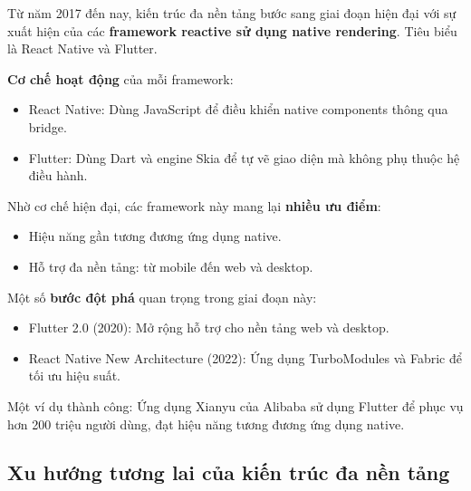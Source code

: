 \begin{flushleft}
  \begin{flushleft}
    Từ năm 2017 đến nay, kiến trúc đa nền tảng bước sang giai đoạn hiện đại với sự xuất hiện của 
    các \textbf{framework reactive sử dụng native rendering}. Tiêu biểu là React Native và Flutter.
  \end{flushleft}

  \begin{flushleft}
    \textbf{Cơ chế hoạt động} của mỗi framework:
    \setlength{\leftmargini}{1.5cm}
    \begin{itemize}
      \item React Native: Dùng JavaScript để điều khiển native components thông qua bridge.
      \item Flutter: Dùng Dart và engine Skia để tự vẽ giao diện mà không phụ thuộc hệ điều hành.
    \end{itemize}
  \end{flushleft}

  \begin{flushleft}
    Nhờ cơ chế hiện đại, các framework này mang lại \textbf{nhiều ưu điểm}:
    \setlength{\leftmargini}{1.5cm}
    \begin{itemize}
      \item Hiệu năng gần tương đương ứng dụng native.
      \item Hỗ trợ đa nền tảng: từ mobile đến web và desktop.
    \end{itemize}
  \end{flushleft}

  \begin{flushleft}
    Một số \textbf{bước đột phá} quan trọng trong giai đoạn này:
    \setlength{\leftmargini}{1.5cm}
    \begin{itemize}
      \item Flutter 2.0 (2020): Mở rộng hỗ trợ cho nền tảng web và desktop.
      \item React Native New Architecture (2022): Ứng dụng TurboModules và Fabric để tối ưu hiệu suất.
    \end{itemize}
  \end{flushleft}

  \begin{flushleft}
    Một ví dụ thành công: Ứng dụng Xianyu của Alibaba sử dụng Flutter để phục vụ hơn 200 triệu người dùng, 
    đạt hiệu năng tương đương ứng dụng native.
  \end{flushleft}
\end{flushleft}
\subsection{Xu hướng tương lai của kiến trúc đa nền tảng}
\renewcommand{\labelitemi}{--}

